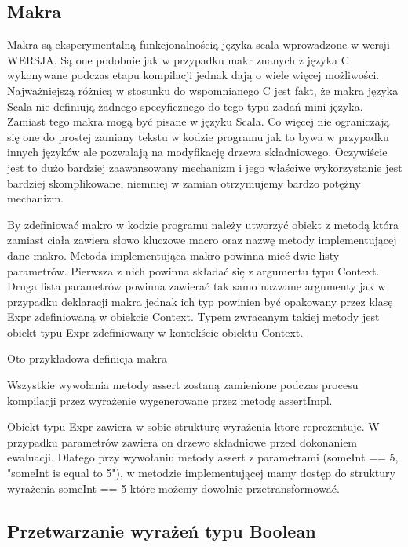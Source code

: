 \documentclass[brudnopis]{xmgr}
\begin{document}
\subsection{Makra}

Makra są eksperymentalną funkcjonalnością języka scala wprowadzone w wersji WERSJA. Są one podobnie jak w przypadku makr znanych z języka C wykonywane podczas etapu kompilacji jednak dają o wiele więcej możliwości. Najważniejszą różnicą w stosunku do wspomnianego C jest fakt, że makra języka Scala nie definiują żadnego specyficznego do tego typu zadań mini-języka. Zamiast tego makra mogą być pisane w języku Scala. Co więcej nie ograniczają się one do prostej zamiany tekstu w kodzie programu jak to bywa w przypadku innych języków ale pozwalają na modyfikację drzewa składniowego. Oczywiście jest to dużo bardziej zaawansowany mechanizm i jego właściwe wykorzystanie jest bardziej skomplikowane, niemniej w zamian otrzymujemy bardzo potężny mechanizm.

By zdefiniować makro w kodzie programu należy utworzyć obiekt z metodą która zamiast ciała zawiera słowo kluczowe macro oraz nazwę metody implementującej dane makro.
Metoda implementująca makro powinna mieć dwie listy parametrów. Pierwsza z nich powinna składać się z argumentu typu Context. Druga lista parametrów powinna zawierać tak samo nazwane argumenty jak w przypadku deklaracji makra jednak ich typ powinien być opakowany przez klasę Expr zdefiniowaną w obiekcie Context. Typem zwracanym takiej metody jest obiekt typu Expr zdefiniowany w kontekście obiektu Context.

Oto przykładowa definicja makra



Wszystkie wywołania metody assert zostaną zamienione podczas procesu kompilacji przez wyrażenie wygenerowane przez metodę assertImpl. 

Obiekt typu Expr zawiera w sobie strukturę wyrażenia ktore reprezentuje. W przypadku parametrów zawiera on drzewo składniowe przed dokonaniem ewaluacji. Dlatego przy wywołaniu metody assert z parametrami (someInt == 5, "someInt is equal to 5"), w metodzie implementującej mamy dostęp do struktury wyrażenia someInt == 5 które możemy dowolnie przetransformować.

\subsection{Przetwarzanie wyrażeń typu Boolean}
\end{document}
